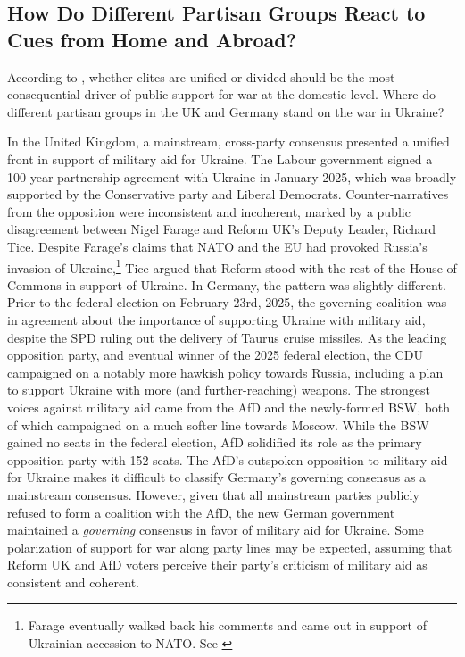 \begin{appendices}
\subsection{How Do Different Partisan Groups React to Cues from Home and Abroad?}
According to \textcite{berinsky_assuming_2007}, whether elites are unified or divided should be the most consequential driver of public support for war at the domestic level. Where do different partisan groups in the UK and Germany stand on the war in Ukraine?

In the United Kingdom, a mainstream, cross-party consensus presented a unified front in support of military aid for Ukraine. The Labour government signed a 100-year partnership agreement with Ukraine in January 2025, which was broadly supported by the Conservative party and Liberal Democrats. Counter-narratives from the opposition were inconsistent and incoherent, marked by a public disagreement between Nigel Farage and Reform UK's Deputy Leader, Richard Tice. Despite Farage's claims that NATO and the EU had provoked Russia's invasion of Ukraine,\footnote{Farage eventually walked back his comments and came out in support of Ukrainian accession to NATO. See \textcite{keate_trumps_2025}} Tice argued that Reform stood  with the rest of the House of Commons in support of Ukraine.\autocite{mason_labour_2025} In Germany, the pattern was slightly different. Prior to the federal election on February 23rd, 2025, the governing coalition was in agreement about the importance of supporting Ukraine with military aid, despite the SPD ruling out the delivery of Taurus cruise missiles. As the leading opposition party, and eventual winner of the 2025 federal election, the CDU campaigned on a notably more hawkish policy towards Russia, including a plan to support Ukraine with more (and further-reaching) weapons. The strongest voices against military aid came from the AfD and the newly-formed BSW, both of which campaigned on a much softer line towards Moscow. While the BSW gained no seats in the federal election, AfD solidified its role as the primary opposition party with 152 seats. The AfD's outspoken opposition to military aid for Ukraine makes it difficult to classify Germany's governing consensus as a mainstream consensus. However, given that all mainstream parties publicly refused to form a coalition with the AfD, the new German government maintained a \emph{governing} consensus in favor of military aid for Ukraine. Some polarization of support for war along party lines may be expected, assuming that Reform UK and AfD voters perceive their party's criticism of military aid as consistent and coherent.\autocite{brader_which_2013} 


\end{appendices}
